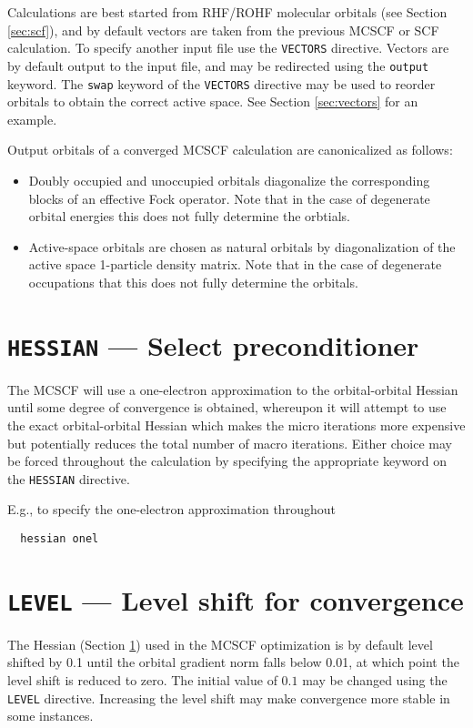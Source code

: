 Calculations are best started from RHF/ROHF molecular orbitals (see
Section \ref{sec:scf}), and by default vectors are taken from the
previous MCSCF or SCF calculation.  To specify another input file use
the \verb+VECTORS+ directive.  Vectors are by default output to the
input file, and may be redirected using the \verb+output+ keyword.
The \verb+swap+ keyword of the \verb+VECTORS+ directive may be
used to reorder orbitals to obtain the correct active space.
See Section \ref{sec:vectors} for an example.

Output orbitals of a converged MCSCF calculation are canonicalized as
follows:
\begin{itemize}
\item Doubly occupied and unoccupied orbitals diagonalize the
  corresponding blocks of an effective Fock operator.  Note that in
  the case of degenerate orbital energies this does not fully
  determine the orbtials.
\item Active-space orbitals are chosen as natural orbitals by
  diagonalization of the active space 1-particle density matrix.
  Note that in the case of degenerate occupations that this
  does not fully determine the orbitals.
\end{itemize}

\section{{\tt HESSIAN} --- Select preconditioner}
\label{sec:mcscfhessian}

The MCSCF will use a one-electron approximation to the orbital-orbital
Hessian until some degree of convergence is obtained, whereupon it
will attempt to use the exact orbital-orbital Hessian which makes the
micro iterations more expensive but potentially reduces the total
number of macro iterations.  Either choice may be forced throughout
the calculation by specifying the appropriate keyword on the
\verb+HESSIAN+ directive.

E.g., to specify the one-electron approximation throughout
\begin{verbatim}
  hessian onel
\end{verbatim}

\section{{\tt LEVEL} --- Level shift for convergence}

The Hessian (Section \ref{sec:mcscfhessian}) used in the MCSCF
optimization is by default level shifted by 0.1 until the orbital
gradient norm falls below 0.01, at which point the level shift is
reduced to zero.  The initial value of $0.1$ may be changed using
the \verb+LEVEL+ directive.  Increasing the level shift may make
convergence more stable in some instances.


